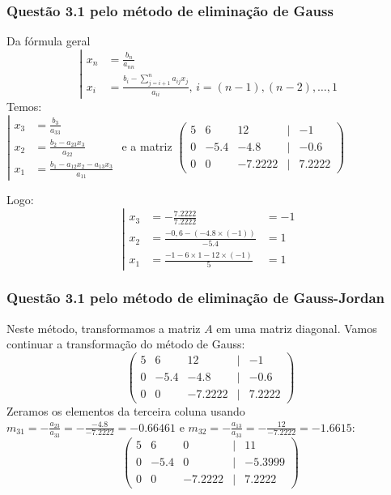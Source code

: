 \begin{frame}
\frametitle{Questão 3.1 pelo método de eliminação de Gauss}
\small
Da fórmula geral
\[
\left|
\begin{array}{ll}
x_n &= \frac{b_n}{a_{nn}}\\
x_i &= \frac{b_i - \sum_{j=i+1}^{n}a_{ij}x_j}{a_{ii}} \text{, }i = (n-1), (n-2), \ldots, 1
\end{array} 
\right.
\]
Temos:\\
$
\left|
\begin{array}{ll}
x_3 &= \frac{b_3}{a_{33}}\\
x_2 & = \frac{b_2 - a_{23}x_3}{a_{22}}\\
x_1 & = \frac{b_1 - a_{12}x_2 - a_{13}x_3}{a_{11}}
\end{array} 
\right.
$ e a matriz
$
\begin{pmatrix}
5 & 6 & 12 & | & -1\\
0 & -5.4 & -4.8 & | & -0.6\\
0 & 0 & -7.2222 & | & 7.2222 
\end{pmatrix}
$

Logo:
\[
\left|
\begin{array}{lll}
x_3 &= -\frac{7.2222}{7.2222}&=-1\\
x_2 & = \frac{-0,6 - (-4.8 \times (-1))}{-5.4} &=1\\
x_1 & = \frac{-1 - 6\times 1 - 12 \times (-1)}{5} &=1
\end{array} 
\right.
\]

\end{frame}

\begin{frame}
\frametitle{Questão 3.1 pelo método de eliminação de Gauss-Jordan}
\small
Neste método, transformamos a matriz $A$ em uma matriz diagonal. Vamos continuar a transformação do método de Gauss:
\[
\begin{pmatrix}
5 & 6 & 12 & | & -1\\
0 & -5.4 & -4.8 & | & -0.6\\
0 & 0 & -7.2222 & | & 7.2222 
\end{pmatrix}
\]
Zeramos os elementos da terceira coluna usando $m_{31}=-\frac{a_{23}}{a_{33}}=-\frac{-4.8}{-7.2222}=-0.66461$ e $m_{32}=-\frac{a_{13}}{a_{33}}=-\frac{12}{-7.2222}=-1.6615$:
\[
\begin{pmatrix}
5 & 6 & 0 & | & 11\\
0 & -5.4 & 0 & | & -5.3999\\
0 & 0 & -7.2222 & | & 7.2222 
\end{pmatrix}
\]
\end{frame}

